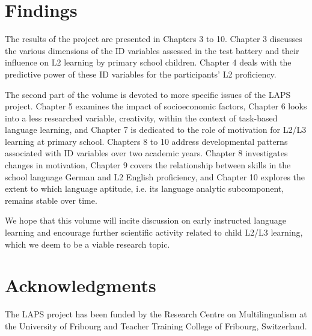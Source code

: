 \documentclass[output=paper]{langsci/langscibook}
\begin{document}
\section{Findings}\label{sec:intro:5}\largerpage

The results of the project are presented in Chapters 3 to 10. Chapter 3 discusses the various dimensions of the ID variables assessed in the test battery and their influence on L2 learning by primary school children. Chapter 4 deals with the predictive power of these ID variables for the participants’ L2 proficiency.

The second part of the volume is devoted to more specific issues of the LAPS project. Chapter 5 examines the impact of socioeconomic factors, Chapter 6 looks into a less researched variable, creativity, within the context of task-based language learning, and Chapter 7 is dedicated to the role of motivation for L2/L3 learning at primary school. Chapters 8 to 10 address developmental patterns associated with ID variables over two academic years. Chapter 8 investigates changes in motivation, Chapter 9 covers the relationship between skills in the school language German and L2 English proficiency, and Chapter 10 explores the extent to which language aptitude, i.e. its language analytic subcomponent, remains stable over time.

We hope that this volume will incite discussion on early instructed language learning and encourage further scientific activity related to child L2/L3 learning, which we deem to be a viable research topic.

\section*{Acknowledgments}

The LAPS project has been funded by the Research Centre on Multilingualism at the University of Fribourg and Teacher Training College of Fribourg, Switzerland. 
\end{document}
